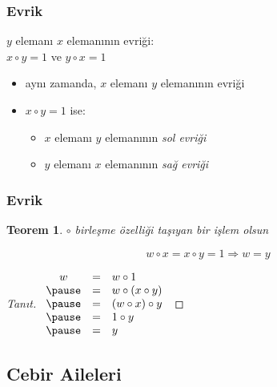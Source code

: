 \documentclass[dvipsnames]{beamer}
\theoremstyle{definition}
\theoremstyle{example}
\theoremstyle{plain}
\newtheorem{teorem}[theorem]{Teorem}
\begin{document}
\begin{frame}
  \frametitle{Evrik}

  \begin{definition}
    $y$ elemanı $x$ elemanının \alert{evriği}:\\
    $x \circ y = 1$ ve $y \circ x = 1$

    \begin{itemize}
      \item aynı zamanda, $x$ elemanı $y$ elemanının evriği
    \end{itemize}
  \end{definition}

  \pause
  \begin{itemize}
    \item $x \circ y = 1$ ise:
    \begin{itemize}
      \item $x$ elemanı $y$ elemanının \emph{sol evriği}
      \item $y$ elemanı $x$ elemanının \emph{sağ evriği}
    \end{itemize}
  \end{itemize}
\end{frame}

\begin{frame}
  \frametitle{Evrik}

  \begin{teorem}
    $\circ$ birleşme özelliği taşıyan bir işlem olsun

    \[ w \circ x = x \circ y = 1 \Rightarrow w = y \]
  \end{teorem}

  \pause
  \begin{proof}[Tanıt]
    $\begin{array}{ccl}
      w & = & w \circ 1\\ \pause
        & = & w \circ (x \circ y)\\ \pause
        & = & (w \circ x) \circ y\\ \pause
        & = & 1 \circ y\\ \pause
        & = & y
    \end{array}$
  \end{proof}
\end{frame}

\subsection{Cebir Aileleri}
\end{document}
